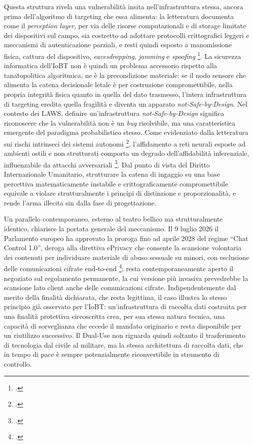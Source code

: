 \documentclass[a4paper,12pt]{report}
\begin{document}
Questa struttura rivela una vulnerabilità insita nell'infrastruttura stessa,
ancora prima dell'algoritmo di targeting che essa alimenta: la letteratura
documenta come il \textit{perception layer}, per via delle risorse computazionali
e di storage limitate dei dispositivi sul campo, sia costretto ad adottare
protocolli crittografici leggeri e meccanismi di autenticazione parziali, e resti
quindi esposto a manomissione fisica, cattura del dispositivo,
\textit{eavesdropping}, \textit{jamming} e \textit{spoofing}
\footcite{kufakunesu_2025_iobt}. La sicurezza informatica dell'IoBT non è quindi
un problema accessorio rispetto alla tanatopolitica algoritmica, ne è la
precondizione materiale: se il nodo sensore che alimenta la catena decisionale
letale è per costruzione compromettibile, nella propria integrità fisica quanto
in quella del dato trasmesso, l'intera infrastruttura di targeting eredita quella
fragilità e diventa un apparato \textit{not-Safe-by-Design}. Nel
contesto dei LAWS, definire un'infrastruttura \textit{not-Safe-by-Design}
significa riconoscere che la vulnerabilità non è un \textit{bug} risolvibile, ma
una caratteristica emergente del paradigma probabilistico stesso. Come evidenziato
dalla letteratura sui rischi intrinseci dei sistemi autonomi
\footcite{podar_2025}, l'affidamento a reti neurali esposte ad ambienti ostili e
non strutturati comporta un degrado dell'affidabilità inferenziale, influenzabile
da attacchi avversariali \footcite{cina_2023_poisoning}. Dal punto di vista del
Diritto Internazionale Umanitario, strutturare la catena di ingaggio su una base
percettiva matematicamente instabile e crittograficamente compromettibile
equivale a violare strutturalmente i principi di distinzione e proporzionalità, e
rende l'arma illecita sin dalla fase di progettazione.

Un parallelo contemporaneo, esterno al teatro bellico ma strutturalmente
identico, chiarisce la portata generale del meccanismo. Il 9 luglio 2026 il
Parlamento europeo ha approvato la proroga fino ad aprile 2028 del regime
``Chat Control 1.0'', deroga alla direttiva ePrivacy che consente la scansione
volontaria dei contenuti per individuare materiale di abuso sessuale su minori,
con esclusione delle comunicazioni cifrate end-to-end
\footcite{euronews_chatcontrol_2026}; resta contemporaneamente aperto il
negoziato sul regolamento permanente, la cui versione più invasiva prevedrebbe
la scansione lato client anche delle comunicazioni cifrate. Indipendentemente
dal merito della finalità dichiarata, che resta legittima, il caso illustra lo
stesso principio già osservato per l'IoBT: un'infrastruttura di raccolta dati
costruita per una finalità protettiva circoscritta crea, per sua stessa natura
tecnica, una capacità di sorveglianza che eccede il mandato originario e resta
disponibile per un riutilizzo successivo. Il Dual-Use non riguarda quindi
soltanto il trasferimento di tecnologia dal civile al militare, ma la stessa
architettura di raccolta dati, che in tempo di pace è sempre potenzialmente
riconvertibile in strumento di controllo.
\end{document}
